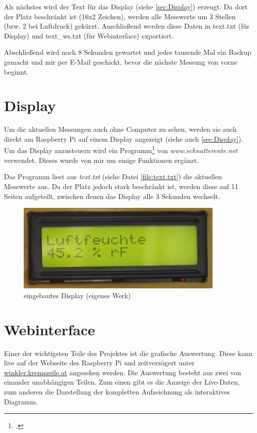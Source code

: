 Als nächstes wird der Text für das Display (siehe \ref{sec:Display}) erzeugt. Da dort der Platz beschränkt ist (16x2 Zeichen), werden alle Messwerte um 3 Stellen (bzw. 2 bei Luftdruck) gekürzt. Anschließend werden diese Daten in text.txt (für Display) und text\_ws.txt (für Webinterface) exportiert.


Abschließend wird noch 8 Sekunden gewartet und jedes tausende Mal ein Backup gemacht und mir per E-Mail geschickt, bevor die nächste Messung von vorne beginnt.

\section{Display}
\label{sec:Software/Display}
Um die aktuellen Messungen auch ohne Computer zu sehen, werden sie auch direkt am Raspberry Pi auf einem Display angezeigt (siehe auch \ref{sec:Display}). Um das Display anzusteuern wird ein Programm\footcite{schnatterente_code} von \emph{www.schnatterente.net} verwendet. Dieses wurde von mir um einige Funktionen ergänzt. 

Das Programm liest aus \emph{text.txt} (siehe Datei \ref{file:text.txt}) die aktuellen Messwerte aus. Da der Platz jedoch stark beschränkt ist, werden diese auf 11 Seiten aufgeteilt, zwischen denen das Display alle 3 Sekunden wechselt.
\begin{figure}[h]
  \centering
     \includegraphics[width=0.9\textwidth]{figures/display.jpg}
  \caption{eingebautes Display (eigenes Werk)}
  \label{fig:display_alt}
\end{figure}

\section{Webinterface}
\label{sec:Webinterface}

Einer der wichtigsten Teile des Projektes ist die grafische Auswertung. Diese kann live auf der Webseite des Raspberry Pi und zeitverzögert unter \href{http://winkler.kremszeile.at}{winkler.kremszeile.at} angesehen werden. Die Auswertung besteht aus zwei von einander unabhängigen Teilen. Zum einen gibt es die Anzeige der Live-Daten, zum anderen die Darstellung der kompletten Aufzeichnung als interaktives Diagramm.

